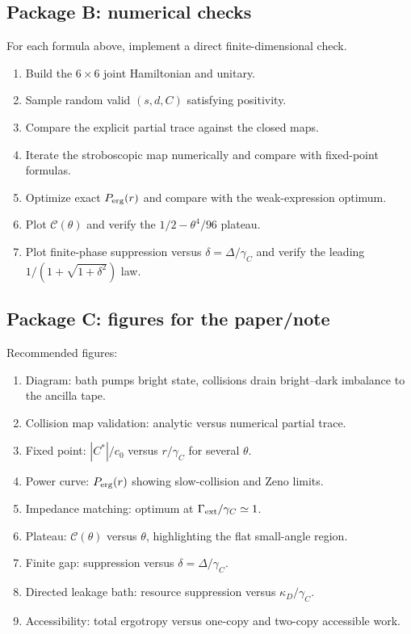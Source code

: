 \documentclass[11pt,a4paper]{article}
\begin{document}
\subsection{Package B: numerical checks}

For each formula above, implement a direct finite-dimensional check.

\begin{enumerate}
\item Build the $6\times6$ joint Hamiltonian and unitary.
\item Sample random valid $(s,d,C)$ satisfying positivity.
\item Compare the explicit partial trace against the closed maps.
\item Iterate the stroboscopic map numerically and compare with fixed-point formulas.
\item Optimize exact $P_{\rm erg}(r)$ and compare with the weak-expression optimum.
\item Plot $\mathcal C(\theta)$ and verify the $1/2-\theta^4/96$ plateau.
\item Plot finite-phase suppression versus $\delta=\Delta/\gamma_C$ and verify the leading $1/(1+\sqrt{1+\delta^2})$ law.
\end{enumerate}

\subsection{Package C: figures for the paper/note}

Recommended figures:

\begin{enumerate}
\item Diagram: bath pumps bright state, collisions drain bright--dark imbalance to the ancilla tape.
\item Collision map validation: analytic versus numerical partial trace.
\item Fixed point: $|C^*|/c_0$ versus $r/\gamma_C$ for several $\theta$.
\item Power curve: $P_{\rm erg}(r)$ showing slow-collision and Zeno limits.
\item Impedance matching: optimum at $\Gamma_{\rm ext}/\gamma_C\simeq1$.
\item Plateau: $\mathcal C(\theta)$ versus $\theta$, highlighting the flat small-angle region.
\item Finite gap: suppression versus $\delta=\Delta/\gamma_C$.
\item Directed leakage bath: resource suppression versus $\kappa_D/\gamma_C$.
\item Accessibility: total ergotropy versus one-copy and two-copy accessible work.
\end{enumerate}
\end{document}
